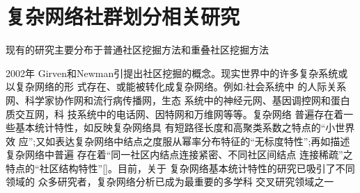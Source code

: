 \section{复杂网络社群划分相关研究}

		现有的研究主要分布于普通社区挖掘方法和重叠社区挖掘方法

2002年 Girven和Newman引提出社区挖掘的概念。现实世界中的许多复杂系统或以复杂网络的形 式存在、或能被转化成复杂网络。例如:社会系统中 的人际关系网、科学家协作网和流行病传播网，生态 系统中的神经元网、基因调控网和蛋白质交互网，科 技系统中的电话网、因特网和万维网等等。复杂网络 普遍存在着一些基本统计特性，如反映复杂网络具 有短路径长度和高聚类系数之特点的“小世界效 应”;又如表达复杂网络中结点之度服从幂率分布特征的“无标度特性”;再如描述复杂网络中普遍 存在着“同一社区内结点连接紧密、不同社区间结点 连接稀疏”之特点的“社区结构特性”[]。目前，关于 复杂网络基本统计特性的研究已吸引了不同领域的 众多研究者，复杂网络分析已成为最重要的多学科 交叉研究领域之一

